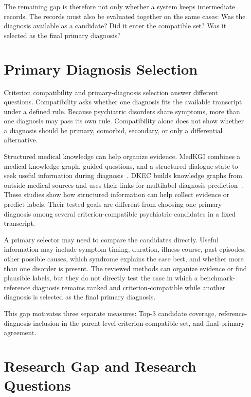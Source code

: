 \documentclass[12pt,a4paper,oneside]{report}
\begin{document}
The remaining gap is therefore not only whether a system keeps intermediate records. The records must also be evaluated together on the same cases: Was the diagnosis available as a candidate? Did it enter the compatible set? Was it selected as the final primary diagnosis?

\section{Primary Diagnosis Selection}

Criterion compatibility and primary-diagnosis selection answer different questions. Compatibility asks whether one diagnosis fits the available transcript under a defined rule. Because psychiatric disorders share symptoms, more than one diagnosis may pass its own rule. Compatibility alone does not show whether a diagnosis should be primary, comorbid, secondary, or only a differential alternative.

Structured medical knowledge can help organize evidence. MedKGI combines a medical knowledge graph, guided questions, and a structured dialogue state to seek useful information during diagnosis~\citep{wang2025medkgi}. DKEC builds knowledge graphs from outside medical sources and uses their links for multilabel diagnosis prediction~\citep{ge2024dkec}. These studies show how structured information can help collect evidence or predict labels. Their tested goals are different from choosing one primary diagnosis among several criterion-compatible psychiatric candidates in a fixed transcript.

A primary selector may need to compare the candidates directly. Useful information may include symptom timing, duration, illness course, past episodes, other possible causes, which syndrome explains the case best, and whether more than one disorder is present. The reviewed methods can organize evidence or find plausible labels, but they do not directly test the case in which a benchmark-reference diagnosis remains ranked and criterion-compatible while another diagnosis is selected as the final primary diagnosis.

This gap motivates three separate measures: Top-3 candidate coverage, reference-diagnosis inclusion in the parent-level criterion-compatible set, and final-primary agreement.

\section{Research Gap and Research Questions}
\end{document}
